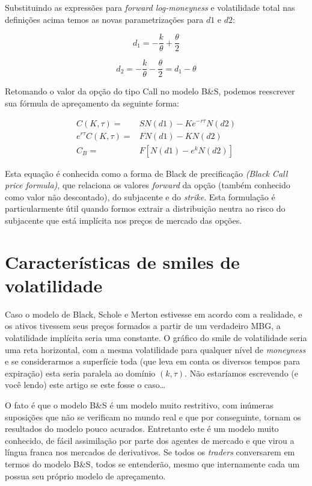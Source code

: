 \documentclass[]{book}
\theoremstyle{definition}
\theoremstyle{definition}
\theoremstyle{definition}
\theoremstyle{remark}
\begin{document}
Substituindo as expressões para \emph{forward log-moneyness} e volatilidade total nas definições acima temos as novas parametrizações para \(d1\) e \(d2\):

\begin{equation}
d_{1}={-\frac{k}{\theta}+\frac{\theta}{2}}
\label{eq:d1mod}
\end{equation}

\begin{equation}
d_{2}={-\frac{k}{\theta}-\frac{\theta}{2}}=d_1-\theta
\label{eq:d2mod}
\end{equation}

Retomando o valor da opção do tipo Call no modelo B\&S, podemos reescrever sua fórmula de apreçamento da seguinte forma:

\begin{equation}
\begin{aligned}
C(K, \tau)=&SN(d1)-Ke^{-r\tau}N(d2)\\
e^{r\tau}C(K, \tau)=&FN(d1)-KN(d2)\\
C_B=&F\left[N(d1)-e^kN(d2)\right]
\end{aligned}
\label{eq:cblack}
\end{equation}

Esta equação é conhecida como a forma de Black de precificação \emph{(Black Call price formula)}, que relaciona os valores \emph{forward} da opção (também conhecido como valor não descontado), do subjacente e do \emph{strike}. Esta formulação é particularmente útil quando formos extrair a distribuição neutra ao risco do subjacente que está implícita nos preços de mercado das opções.

\hypertarget{caracsmile}{%
\section{Características de smiles de volatilidade}\label{caracsmile}}

Caso o modelo de Black, Schole e Merton estivesse em acordo com a realidade, e os ativos tivessem seus preços formados a partir de um verdadeiro MBG, a volatilidade implícita seria uma constante. O gráfico do smile de volatilidade seria uma reta horizontal, com a mesma volatilidade para qualquer nível de \emph{moneyness} e se considerarmos a superfície toda (que leva em conta os diversos tempos para expiração) esta seria paralela ao domínio \((k, \tau)\). Não estaríamos escrevendo (e você lendo) este artigo se este fosse o caso\ldots{}

O fato é que o modelo B\&S é um modelo muito restritivo, com inúmeras suposições que não se verificam no mundo real e que por conseguinte, tornam os resultados do modelo pouco acurados. Entretanto este é um modelo muito conhecido, de fácil assimilação por parte dos agentes de mercado e que virou a língua franca nos mercados de derivativos. Se todos os \emph{traders} conversarem em termos do modelo B\&S, todos se entenderão, mesmo que internamente cada um possua seu próprio modelo de apreçamento.
\end{document}
